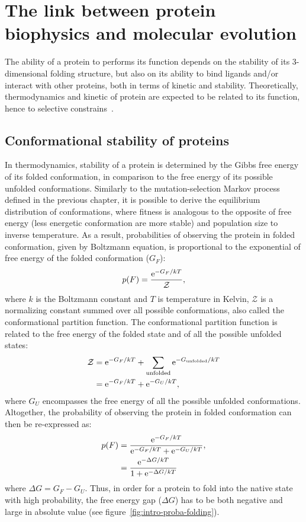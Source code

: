 \section{The link between protein biophysics and molecular evolution}
\label{sec:intro-protein-biophysics}

The ability of a protein to performs its function depends on the stability of its 3-dimensional folding structure, but also on its ability to bind ligands and/or interact with other proteins, both in terms of kinetic and stability.
Theoretically, thermodynamics and kinetic of protein are expected to be related to its function, hence to selective constrains~\citep{Bastolla2017}.

\subsection{Conformational stability of proteins}

In thermodynamics, stability of a protein is determined by the Gibbs free energy of its folded conformation, in comparison to the free energy of its possible unfolded conformations.
Similarly to the mutation-selection Markov process defined in the previous chapter, it is possible to derive the equilibrium distribution of conformations, where fitness is analogous to the opposite of free energy (less energetic conformation are more stable) and population size to inverse temperature.
As a result, probabilities of observing the protein in folded conformation, given by Boltzmann equation, is proportional to the exponential of free energy of the folded conformation ($G_F$):
\begin{equation}
p(F) = \frac{\mathrm{e}^{-G_F / kT}}{\mathcal{Z}},
\end{equation}
where $k$ is the Boltzmann constant and $T$ is temperature in Kelvin, $\mathcal{Z}$ is a normalizing constant summed over all possible conformations, also called the conformational {partition function}.
The conformational partition function is related to the free energy of the folded state and of all the possible unfolded states:
\begin{align}
\mathcal{Z} & = \mathrm{e}^{-G_F / kT} + \sum\limits_{\text{unfolded}} \mathrm{e}^{-G_{\text{unfolded}} / kT} \\
            & = \mathrm{e}^{-G_F / kT} + \mathrm{e}^{-G_U / kT},
\end{align}
where $G_U$ encompasses the free energy of all the possible unfolded conformations.
Altogether, the probability of observing the protein in folded conformation can then be re-expressed as:
\begin{align}
p(F) & = \frac{\mathrm{e}^{-G_F / kT}}{\mathrm{e}^{-G_F / kT} + \mathrm{e}^{-G_U / kT}}, \\
     & = \frac{\mathrm{e}^{-\Delta G/kT}}{ 1 + \mathrm{e}^{-\Delta G/kT} }
\end{align}
where $\Delta G = G_F - G_U$.
Thus, in order for a protein to fold into the native state with high probability, the free energy gap ($\Delta G$) has to be both negative and large in absolute value (see figure~\ref{fig:intro-proba-folding}).


